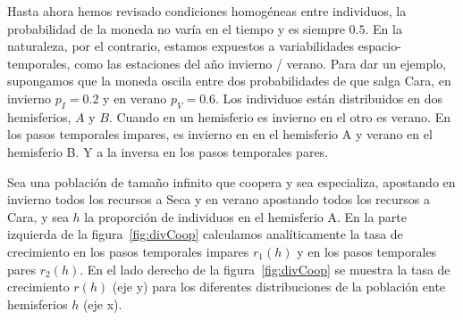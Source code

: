 \documentclass[a4paper,11pt]{book}
\theoremstyle{definition}
\begin{document}
Hasta ahora hemos revisado condiciones homog\'eneas entre individuos, la probabilidad de la moneda no var\'ia en el tiempo y es siempre $0.5$.
%
En la naturaleza, por el contrario, estamos expuestos a variabilidades espacio-temporales, como las estaciones del a\~no invierno / verano.
%
Para dar un ejemplo, supongamos que la moneda oscila entre dos probabilidades de que salga Cara, en invierno $p_I = 0.2$ y en verano $p_V = 0.6$.
%
Los individuos est\'an distribuidos en dos hemisferios, $A$ y $B$.
%
Cuando en un hemisferio es invierno en el otro es verano.
%
En los pasos temporales impares, es invierno en en el hemisferio A y verano en el hemisferio B.
%
Y a la inversa en los pasos temporales pares.
%


Sea una poblaci\'on de tama\~no infinito que coopera y sea especializa, apostando en invierno todos los recursos a Seca y en verano apostando todos los recursos a Cara, y sea $h$ la proporci\'on de individuos en el hemisferio A.
%
En la parte izquierda de la figura~\ref{fig:divCoop} calculamos anal\'iticamente la tasa de crecimiento en los pasos temporales impares $r_1(h)$ y en los pasos temporales pares $r_2(h)$.
%
En el lado derecho de la figura~\ref{fig:divCoop} se muestra la tasa de crecimiento $r(h)$ (eje y) para los diferentes distribuciones de la poblaci\'on ente hemisferios $h$ (eje x).
%
\end{document}
